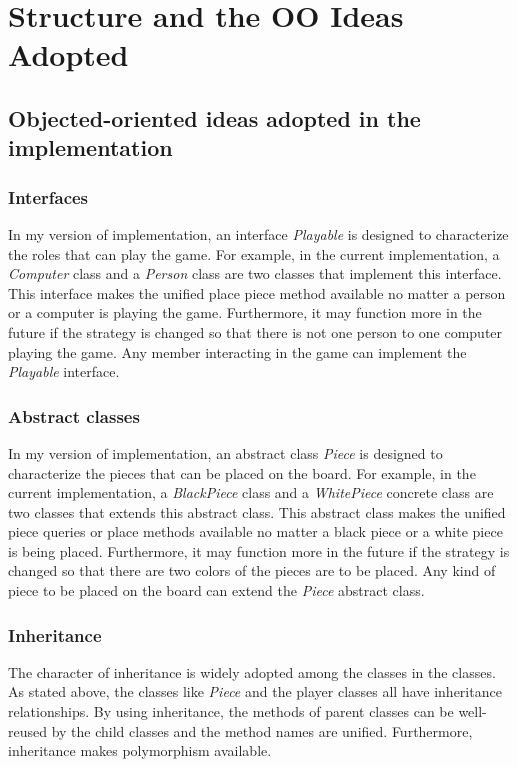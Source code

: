 \documentclass[a4paper]{report}
\begin{document}
\chapter{Structure and  the OO Ideas Adopted}
\section{Objected-oriented ideas adopted in the implementation}
\subsection{Interfaces}
In my version of implementation, an interface \emph{Playable} is designed to characterize the roles that can play the game. For example, in the current implementation, a \emph{Computer} class and a \emph{Person} class are two classes that implement this interface. This interface makes the unified place piece method available no matter a person or a computer is playing the game. Furthermore, it may function more in the future if the strategy is changed so that there is not one person to one computer playing the game. Any member interacting in the game can implement the \emph{Playable} interface.
\subsection{Abstract classes}
In my version of implementation, an abstract class \emph{Piece} is designed to characterize the pieces that can be placed on the board. For example, in the current implementation, a \emph{BlackPiece} class and a \emph{WhitePiece} concrete class are two classes that extends this abstract class. This abstract class makes the unified piece queries or place methods available no matter a black piece or a white piece is being placed. Furthermore, it may function more in the future if the strategy is changed so that there are two colors of the pieces are to be placed. Any kind of piece to be placed on the board can extend the \emph{Piece} abstract class.
\subsection{Inheritance}
The character of inheritance is widely adopted among the classes in the classes. As stated above, the classes like \emph{Piece} and the player classes all have inheritance relationships. By using inheritance, the methods of parent classes can be well-reused by the child classes and the method names are unified. Furthermore, inheritance makes polymorphism available.
\end{document}
